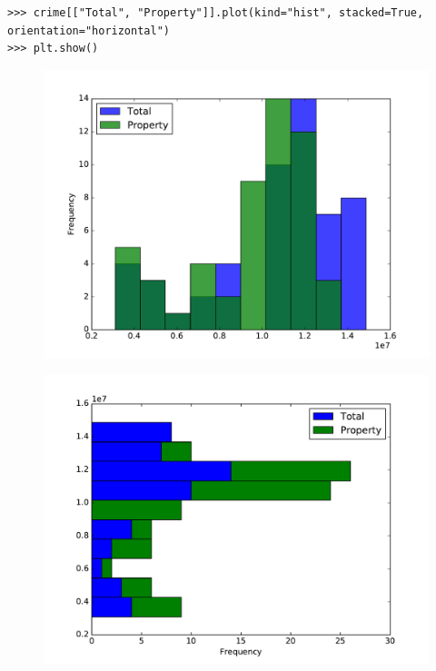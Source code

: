 \begin{lstlisting}
>>> crime[["Total", "Property"]].plot(kind="hist", stacked=True, orientation="horizontal")
>>> plt.show()
\end{lstlisting}

\begin{figure}[H] %
    \centering
    \begin{minipage}[b]{.48\textwidth}
    	 \includegraphics[width=\textwidth]{hist3.pdf}
	 \label{fig:overlap_hist}
    \end{minipage}
    \quad
    \begin{minipage}[b]{.48\textwidth}
    	\includegraphics[width=\textwidth]{hist4.pdf}
	\label{fig:stacked_hist}
    \end{minipage}
\end{figure}

